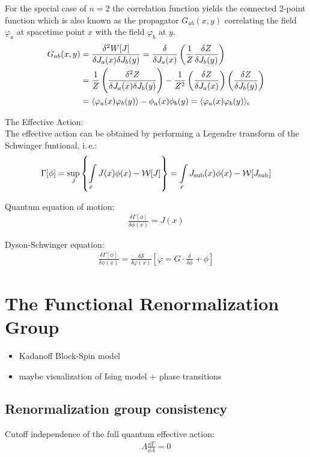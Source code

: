 For the special case of $n=2$ the correlation function yields the connected 2-point function which is also known as the propagator $G_{ab}(x, y)$ correlating the field $\varphi_a$ at spacetime point $x$ with the field $\varphi_b$ at $y$.
\begin{align}
	G_{ab}(x, y) &= \frac{\delta^2W[J]}{\delta J_a(x)\delta J_b(y)} = \frac{\delta}{\delta J_a(x)}\left(\frac{1}{Z}\frac{\delta Z}{\delta J_b(y)}\right) \nonumber \\
				&= \frac{1}{Z}\left(\frac{\delta^2Z}{\delta J_a(x)\delta J_b(y)}\right) - \frac{1}{Z^2}\left(\frac{\delta Z}{\delta J_a(x)}\right)\left(\frac{\delta Z}{\delta J_b(y)}\right)\\
				&= \langle \varphi_a(x)\varphi_b(y) \rangle - \phi_a(x)\phi_b(y) = \langle \varphi_a(x)\varphi_b(y) \rangle_{\text{c}}	\nonumber	
\end{align}

The Effective Action:\\

The effective action can be obtained by performing a Legendre transform of the Schwinger funtional, i.\,e.:
\begin{align}
\Gamma[\phi] = \underset{J}{\operatorname{sup}}\left\{ \int\limits_x J(x)\phi(x) - \mathcal{W}[J] \right\} = \int\limits_x J_{\text{sub}}(x)\phi(x) - \mathcal{W}[J_{\text{sub}}]
\end{align}

Quantum equation of motion:
\begin{align}
\frac{\delta\Gamma[\phi]}{\delta\phi(x)} = J(x)	
\end{align}

Dyson-Schwinger equation:
\begin{align}
\frac{\delta\Gamma[\phi]}{\delta\phi(x)} = \frac{\delta\mathcal{S}}{\delta\varphi(x)} \left[\varphi = G \cdot \frac{\delta}{\delta\phi} + \phi \right]
\end{align}

\section{The Functional Renormalization Group}
\begin{itemize}
	\item Kadanoff Block-Spin model 
	\item maybe visualization of Ising model + phase transitions
\end{itemize}

\subsection{Renormalization group consistency}
Cutoff independence of the full quantum effective action:
\begin{align}
	\Lambda\frac{\dd\Gamma}{\dd\Lambda} = 0
\end{align}

